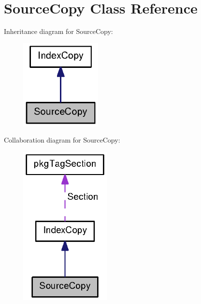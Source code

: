 \section{\-Source\-Copy \-Class \-Reference}
\label{classSourceCopy}


\-Inheritance diagram for \-Source\-Copy\-:
\nopagebreak
\begin{figure}[H]
\begin{center}
\leavevmode
\includegraphics[width=116pt]{classSourceCopy__inherit__graph}
\end{center}
\end{figure}


\-Collaboration diagram for \-Source\-Copy\-:
\nopagebreak
\begin{figure}[H]
\begin{center}
\leavevmode
\includegraphics[width=130pt]{classSourceCopy__coll__graph}
\end{center}
\end{figure}

